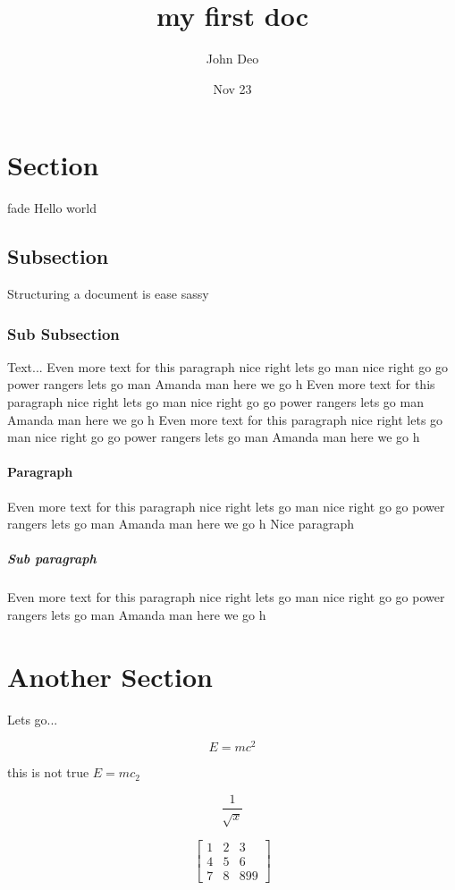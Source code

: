 \documentclass[a4paper]{article}
\title{my first doc}
\date{Nov 23}
\author{John Deo}
\begin{document}
\maketitle
{}

\newpage
\tableofcontents

\newpage
{}

\section{Section}
fade Hello world

\subsection{Subsection}
Structuring a document is ease sassy

\subsubsection{Sub Subsection}
Text...
Even more text for this paragraph nice right lets go man nice right go go power rangers lets go man Amanda man here we go h
Even more text for this paragraph nice right lets go man nice right go go power rangers lets go man Amanda man here we go h
Even more text for this paragraph nice right lets go man nice right go go power rangers lets go man Amanda man here we go h

\paragraph{Paragraph}
Even more text for this paragraph nice  right lets go man nice right go go power rangers lets go man Amanda man here we go h
Nice paragraph
\subparagraph{Sub paragraph}
Even more text for this paragraph nice right lets go man nice right go go power rangers lets go man Amanda man here we go h


\section{Another Section}
Lets go...

\begin{equation}
	E=mc^2
\end{equation}

this is not true
$E=mc_2$

\[
	\frac{1}{\sqrt{x}}
\]

\begin{equation}
	\left[
		\begin{matrix}
			1 & 2 & 3   \\
			4 & 5 & 6   \\
			7 & 8 & 899
		\end{matrix}
		\right]
\end{equation}
\end{document}
